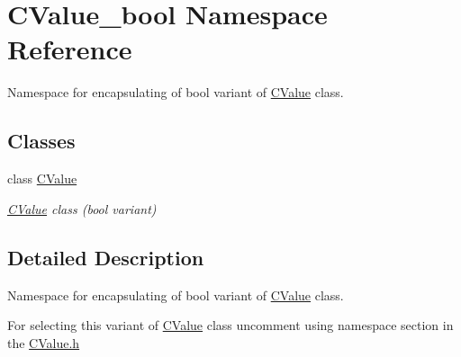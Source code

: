 \hypertarget{namespace_c_value__bool}{}\section{C\+Value\+\_\+bool Namespace Reference}
\label{namespace_c_value__bool}


Namespace for encapsulating of {\ttfamily bool} variant of \hyperlink{class_c_value__bool_1_1_c_value}{C\+Value} class.  


\subsection*{Classes}
\begin{DoxyCompactItemize}
\item 
class \hyperlink{class_c_value__bool_1_1_c_value}{C\+Value}
\begin{DoxyCompactList}\small\item\em \hyperlink{class_c_value__bool_1_1_c_value}{C\+Value} class ({\ttfamily bool} variant) \end{DoxyCompactList}\end{DoxyCompactItemize}


\subsection{Detailed Description}
Namespace for encapsulating of {\ttfamily bool} variant of \hyperlink{class_c_value__bool_1_1_c_value}{C\+Value} class. 

For selecting this variant of \hyperlink{class_c_value__bool_1_1_c_value}{C\+Value} class uncomment {\ttfamily using} {\ttfamily namespace} section in the \hyperlink{_c_value_8h}{C\+Value.\+h} 